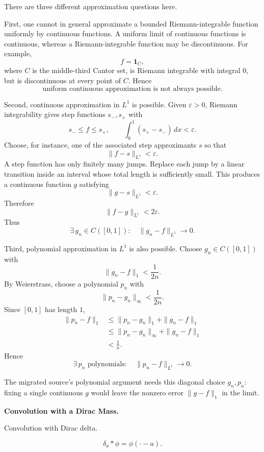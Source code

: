 \begin{solution}
There are three different approximation questions here.

First, one cannot in general approximate a bounded Riemann-integrable function uniformly by
continuous functions. A uniform limit of continuous functions is continuous, whereas a
Riemann-integrable function may be discontinuous. For example,
\[
f=\mathbf1_C,
\]
where \(C\) is the middle-third Cantor set, is Riemann integrable with integral \(0\), but is
discontinuous at every point of \(C\). Hence
\[
\boxed{\text{uniform continuous approximation is not always possible}.}
\]

Second, continuous approximation in \(L^1\) is possible. Given \(\varepsilon>0\), Riemann
integrability gives step functions \(s_-,s_+\) with
\[
s_-\le f\le s_+,
\qquad
\int_0^1(s_+-s_-)\,dx<\varepsilon.
\]
Choose, for instance, one of the associated step approximants \(s\) so that
\[
\|f-s\|_{L^1}<\varepsilon.
\]
A step function has only finitely many jumps. Replace each jump by a linear transition inside
an interval whose total length is sufficiently small. This produces a continuous function
\(g\) satisfying
\[
\|g-s\|_{L^1}<\varepsilon.
\]
Therefore
\[
\|f-g\|_{L^1}<2\varepsilon.
\]
Thus
\[
\boxed{
\exists\,g_n\in C([0,1]):
\quad
\|g_n-f\|_{L^1}\to0.
}
\]

Third, polynomial approximation in \(L^1\) is also possible. Choose \(g_n\in C([0,1])\) with
\[
\|g_n-f\|_1<\frac1{2n}.
\]
By Weierstrass, choose a polynomial \(p_n\) with
\[
\|p_n-g_n\|_\infty<\frac1{2n}.
\]
Since \([0,1]\) has length \(1\),
\[
\begin{aligned}
\|p_n-f\|_1
&\le
\|p_n-g_n\|_1+\|g_n-f\|_1\\
&\le
\|p_n-g_n\|_\infty+\|g_n-f\|_1\\
&<
\frac1n.
\end{aligned}
\]
Hence
\[
\boxed{
\exists\,p_n\text{ polynomials}:
\quad
\|p_n-f\|_{L^1}\to0.
}
\]

The migrated source's polynomial argument needs this diagonal choice \(g_n,p_n\): fixing a
single continuous \(g\) would leave the nonzero error \(\|g-f\|_1\) in the limit.
\end{solution}


\begin{problem}[CP-II-0192]
\label{prob:cp-ii-0192}
\textbf{Convolution with a Dirac Mass.}

\hspace*{1.5em}Convolution with Dirac delta.

\[
\delta_a * \phi = \phi(\cdot - a).
\]
\end{problem}

